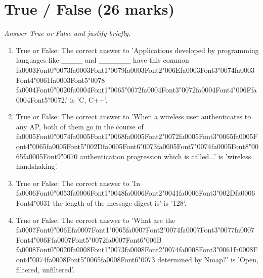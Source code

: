 \documentclass[12pt]{article}
\begin{document}
\section*{True / False (26 marks)}
\textit{Answer True or False and justify briefly.}
\begin{enumerate}[label=\arabic*.]
\item True or False: The correct answer to 'Applications developed by programming languages like \_\_\_\_ and \_\_\_\_\_\_ have this common {\csname fa0003Font0\endcsname\char"0073}{\csname fa0003Font1\endcsname\char"0079}{\csname fa0003Font2\endcsname\char"006E}{\csname fa0003Font3\endcsname\char"0074}{\csname fa0003Font4\endcsname\char"0061}{\csname fa0003Font5\endcsname\char"0078} {\csname fa0004Font0\endcsname\char"0020}{\csname fa0004Font1\endcsname\char"0065}{\char"0072}{\csname fa0004Font3\endcsname\char"0072}{\csname fa0004Font4\endcsname\char"006F}{\csname fa0004Font5\endcsname\char"0072}.' is 'C, C++'.
\item True or False: The correct answer to 'When a wireless user authenticates to any AP, both of them go in the course of {\csname fa0005Font0\endcsname\char"0074}{\csname fa0005Font1\endcsname\char"0068}{\csname fa0005Font2\endcsname\char"0072}{\csname fa0005Font3\endcsname\char"0065}{\csname fa0005Font4\endcsname\char"0065}{\csname fa0005Font5\endcsname\char"002D}{\csname fa0005Font6\endcsname\char"0073}{\csname fa0005Font7\endcsname\char"0074}{\csname fa0005Font8\endcsname\char"0065}{\csname fa0005Font9\endcsname\char"0070} authentication progression which is called...' is 'wireless handshaking'.
\item True or False: The correct answer to 'In {\csname fa0006Font0\endcsname\char"0053}{\csname fa0006Font1\endcsname\char"0048}{\csname fa0006Font2\endcsname\char"0041}{\csname fa0006Font3\endcsname\char"002D}{\csname fa0006Font4\endcsname\char"0031} the length of the message digest is' is '128'.
\item True or False: The correct answer to 'What are the {\csname fa0007Font0\endcsname\char"006E}{\csname fa0007Font1\endcsname\char"0065}{\csname fa0007Font2\endcsname\char"0074}{\csname fa0007Font3\endcsname\char"0077}{\csname fa0007Font4\endcsname\char"006F}{\csname fa0007Font5\endcsname\char"0072}{\csname fa0007Font6\endcsname\char"006B} {\csname fa0008Font0\endcsname\char"0020}{\csname fa0008Font1\endcsname\char"0073}{\csname fa0008Font2\endcsname\char"0074}{\csname fa0008Font3\endcsname\char"0061}{\csname fa0008Font4\endcsname\char"0074}{\csname fa0008Font5\endcsname\char"0065}{\csname fa0008Font6\endcsname\char"0073} determined by Nmap?' is 'Open, filtered, unfiltered'.

\end{enumerate}
\end{document}
